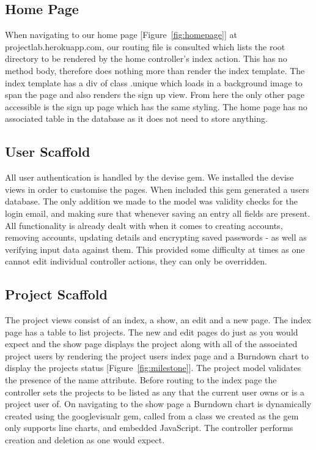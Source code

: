 \documentclass[a4wide, 11pt]{article}
\begin{document}
\subsection{Home Page}
When navigating to our home page [Figure~\ref{fig:homepage}] at projectlab.herokuapp.com, our routing file is consulted which lists the root directory to be rendered by the home controller’s index action. This has no method body, therefore does nothing more than render the index template. The index template has a div of class .unique which loads in a background image to span the page and also renders the sign up view. From here the only other page accessible is the sign up page which has the same styling. The home page has no associated table in the database as it does not need to store anything.

\subsection{User Scaffold}
All user authentication is handled by the devise gem. We installed the devise views in order to customise the pages. When included this gem generated a users database. The only addition we made to the model was validity checks for the login email, and making sure that whenever saving an entry all fields are present. All functionality is already dealt with when it comes to creating accounts, removing accounts, updating details and encrypting saved passwords - as well as verifying input data against them. This provided some difficulty at times as one cannot edit individual controller actions, they can only be overridden.

\subsection{Project Scaffold}
The project views consist of an index, a show, an edit and a new page. The index page has a table to list projects. The new and edit pages do just as you would expect and the show page displays the project along with all of the associated project users by rendering the project users index page and a Burndown chart to display the projects status [Figure~\ref{fig:milestone}]. The project model validates the presence of the name attribute. Before routing to the index page the controller sets the projects to be listed as any that the current user owns or is a project user of. On navigating to the show page a Burndown chart is dynamically created using the googlevisualr gem, called from a class we created as the gem only supports line charts, and embedded JavaScript. The controller performs creation and deletion as one would expect.
\end{document}
